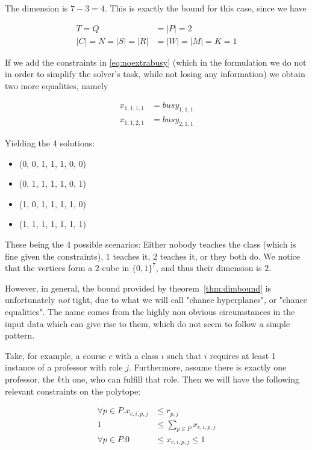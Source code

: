 The dimension is $7 - 3 = 4$. This is exactly the bound for this case, since we have

\begin{align*}
T = Q &= |P| = 2\\
|C| = N = |S| = |R| &= |W| = |M| = K = 1
\end{align*}

If we add the constraints in \ref{eq:noextrabusy} (which in the formulation we do not in order to simplify the solver's task, while not losing any information) we obtain two more equalities, namely

\begin{align*}
x_{1, 1, 1, 1} &= busy_{1, 1, 1}\\
x_{1, 1, 2, 1} &= busy_{2, 1, 1}
\end{align*}

Yielding the 4 solutions:

\begin{itemize}
\item (0, 0, 1, 1, 1, 0, 0)
\item (0, 1, 1, 1, 1, 0, 1)
\item (1, 0, 1, 1, 1, 1, 0)
\item (1, 1, 1, 1, 1, 1, 1)
\end{itemize}

These being the 4 possible scenarios: Either nobody teaches the class (which is fine given the constraints), $1$ teaches it, $2$ teaches it, or they both do. We notice that the vertices form a 2-cube in $\{0, 1\}^7$, and thus their dimension is $2$.

However, in general, the bound provided by theorem~\ref{thm:dimbound} is unfortunately \emph{not} tight, due to what we will call "chance hyperplanes", or "chance equalities". The name comes from the highly non obvious circumstances in the input data which can give rise to them, which do not seem to follow a simple pattern.

Take, for example, a course $c$ with a class $i$ such that $i$ requires at least 1 instance of a professor with role $j$. Furthermore, assume there is exactly one professor, the $k$th one, who can fulfill that role. Then we will have the following relevant constraints on the polytope:

\begin{align*}
\forall p \in P. x_{c, i, p, j} &\le r_{p, j}\\
1 &\le \sum_{p \in P} x_{c, i, p, j}\\
\forall p \in P. 0 &\le x_{c, i, p, j} \le 1
\end{align*}

